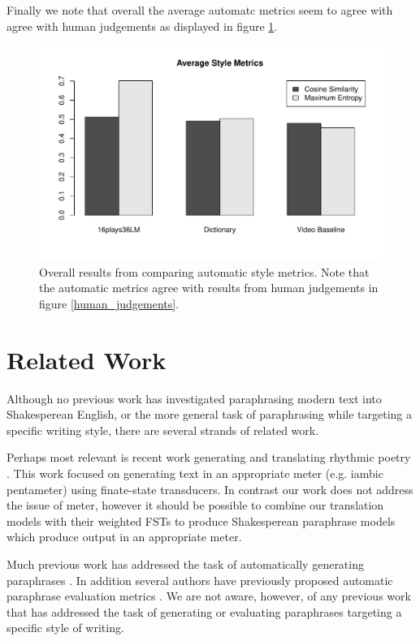 \documentclass[10pt,a5paper,twoside]{article}
\begin{document}
Finally we note that overall the average automatc metrics seem to agree with agree with human judgements as displayed in figure \ref{style_metrics}.

\begin{figure}
  \begin{center}
    \includegraphics[width=5in]{figures/style_metrics.pdf}
    \end{center}
    \caption{Overall results from comparing automatic style metrics.  Note that the automatic metrics agree with results from human judgements in figure \ref{human_judgements}.}
    \label{style_metrics}
\end{figure}

\section{Related Work}
Although no previous work has investigated paraphrasing modern text into Shakesperean English, or the more general task of paraphrasing while targeting a specific writing
style, there are several strands of related work.

Perhaps most relevant is recent work generating and translating rhythmic poetry \cite{Greene10}.  This work focused on generating text in an appropriate
meter (e.g. iambic pentameter) using finate-state transducers.  In contrast our work does not address the issue of meter, however it should be possible to combine our translation
models with their weighted FSTs to produce Shakesperean paraphrase models which produce output in an appropriate meter.

Much previous work has addressed the task of automatically generating paraphrases \cite{Barzilay03,dolan04,Shinyama03,Das09,bannard05,Callison-Burch08,Kok10}.  In addition several authors have previously proposed 
automatic paraphrase evaluation metrics \cite{chen11,Callison-Burch08b,Bangalore00,liu10}.
We are not aware, however, of any previous work that has addressed the task of generating or evaluating
paraphrases targeting a specific style of writing.
\end{document}
